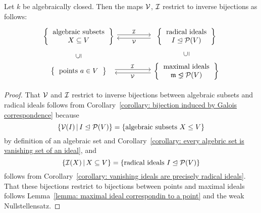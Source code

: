 \begin{proposition}
  Let $k$ be algebraically closed.
  Then the maps $\mathcal{V}$, $\mathcal{I}$ restrict to inverse bijections as follows:
  \[
    \begin{tikzcd}[column sep = huge]
          \left\{
            \begin{tabular}{c}
                algebraic subsets \\
                $X \subseteq V$
            \end{tabular}
          \right\}
          \arrow[shift left, shorten >= 4pt]{r}[above, xshift = -2pt]{\mc{I}}
        & \left\{
            \begin{tabular}{c}
              radical ideals \\
              $I \idealeq \mc{P}(V)$
            \end{tabular}
          \right\}
          \arrow[shift left, shorten <= 4pt]{l}[below, xshift = -2pt]{\mc{V}}
        \\
          \left\{
            \begin{tabular}{c}
              points $a \in V$
            \end{tabular}
          \right\}
          \arrow[phantom]{u}[rotate=90]{\subseteq}
          \arrow[shift left, shorten <= 7.5pt]{r}[above, xshift = 3.25pt]{\mc{I}}
        & \left\{
            \begin{tabular}{c}
              maximal ideals \\
              $\mf{m} \idealneq \mc{P}(V)$
            \end{tabular}
          \right\}
          \arrow[phantom]{u}[rotate=90]{\subseteq}
          \arrow[shift left,shorten >= 7.5pt]{l}[below, xshift =03.25pt]{\mc{V}}
    \end{tikzcd}
  \]
\end{proposition}


\begin{proof}
  That $\mathcal{V}$ and $\mathcal{I}$ restrict to inverse bijections between algebraic subsets and radical ideals follows from Corollary~\ref{corollary: bijection induced by Galois correspondence} because
  \[
      \{ \mc{V}(I) \suchthat I \idealeq \mc{P}(V) \}
    = \{ \text{algebraic subsets $X \leq V$} \}
  \]
  by definition of an algebraic set and Corollary~\ref{corollary: every algebric set is vanishing set of an ideal}, and
  \[
      \{ \mc{I}(X) \suchthat X \subseteq V \}
    = \{ \text{radical ideals $I \idealeq \mc{P}(V)$} \}
  \]
  follows from Corollary~\ref{corollary: vanishing ideals are precisely radical ideals}.
  That these bijections restrict to bijections between points and maximal ideals follows Lemma~\ref{lemma: maximal ideal correspondin to a point} and the weak Nullstellensatz.
\end{proof}



